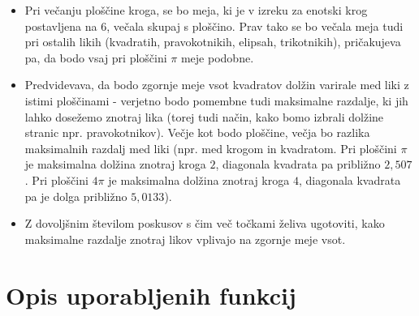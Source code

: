 \documentclass[a4paper]{report}
\begin{document}
\begin{itemize}
\item Pri večanju ploščine kroga, se bo meja, ki je v izreku za enotski krog postavljena na $6$, večala skupaj s ploščino. Prav tako se bo večala meja tudi pri ostalih likih (kvadratih, pravokotnikih, elipsah, trikotnikih), pričakujeva pa, da bodo vsaj pri ploščini $\pi$ meje podobne. \item Predvidevava, da bodo zgornje meje vsot kvadratov dolžin varirale med liki z istimi ploščinami - verjetno bodo pomembne tudi maksimalne razdalje, ki jih lahko dosežemo znotraj lika (torej tudi način, kako bomo izbrali dolžine stranic npr. pravokotnikov). Večje kot bodo ploščine, večja bo razlika maksimalnih razdalj med liki (npr. med krogom in kvadratom. Pri ploščini $\pi$ je maksimalna dolžina znotraj kroga $2$, diagonala kvadrata pa približno $2,507$. Pri ploščini $4\pi$ je maksimalna dolžina znotraj kroga $4$, diagonala kvadrata pa je dolga približno $5,0133$). 
\item Z dovoljšnim številom poskusov s čim več točkami želiva ugotoviti, kako maksimalne razdalje znotraj likov vplivajo na zgornje meje vsot. 
\end{itemize}


\section{Opis uporabljenih funkcij}
\end{document}
